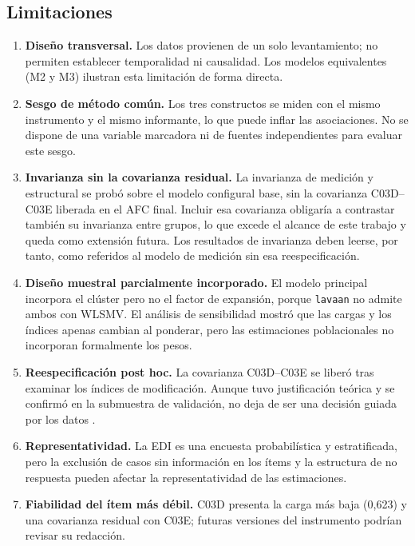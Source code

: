 \documentclass[11pt,a4paper]{article}
\begin{document}
\subsection{Limitaciones}

\begin{enumerate}
\item \textbf{Diseño transversal.} Los datos provienen de un solo levantamiento; no permiten
establecer temporalidad ni causalidad. Los modelos equivalentes (M2 y M3) ilustran esta
limitación de forma directa.
\item \textbf{Sesgo de método común.} Los tres constructos se miden con el mismo instrumento
y el mismo informante, lo que puede inflar las asociaciones. No se dispone de una variable
marcadora ni de fuentes independientes para evaluar este sesgo.
\item \textbf{Invarianza sin la covarianza residual.} La invarianza de medición y estructural
se probó sobre el modelo configural base, sin la covarianza C03D--C03E liberada en el AFC
final. Incluir esa covarianza obligaría a contrastar también su invarianza entre grupos, lo
que excede el alcance de este trabajo y queda como extensión futura. Los resultados de
invarianza deben leerse, por tanto, como referidos al modelo de medición sin esa
reespecificación.
\item \textbf{Diseño muestral parcialmente incorporado.} El modelo principal incorpora el
clúster pero no el factor de expansión, porque \texttt{lavaan} no admite ambos con WLSMV. El
análisis de sensibilidad mostró que las cargas y los índices apenas cambian al ponderar, pero
las estimaciones poblacionales no incorporan formalmente los pesos.
\item \textbf{Reespecificación post hoc.} La covarianza C03D--C03E se liberó tras examinar
los índices de modificación. Aunque tuvo justificación teórica y se confirmó en la submuestra
de validación, no deja de ser una decisión guiada por los datos \citep{maccallum1992}.
\item \textbf{Representatividad.} La EDI es una encuesta probabilística y estratificada, pero
la exclusión de casos sin información en los ítems y la estructura de no respuesta pueden
afectar la representatividad de las estimaciones.
\item \textbf{Fiabilidad del ítem más débil.} C03D presenta la carga más baja (0,623) y una
covarianza residual con C03E; futuras versiones del instrumento podrían revisar su redacción.
\end{enumerate}
\end{document}
